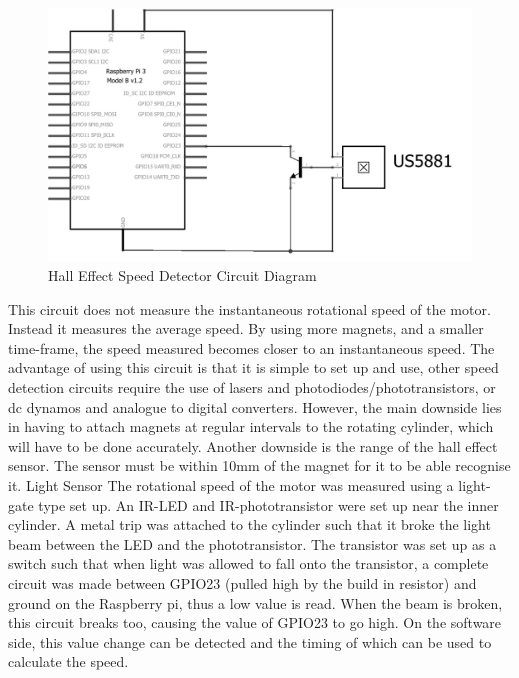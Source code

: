 \documentclass[twoside,a4]{report}
\def\br{\newline \newline \noindent}
\begin{document}
\begin{figure}[!htb]
	\centering
	\includegraphics[scale=0.3]{images/circspeeddet.png}
	\caption{Hall Effect Speed Detector Circuit Diagram}
	\label{circhall}
\end{figure} \newline  \noindent
This circuit does not measure the instantaneous rotational speed of the motor. Instead it measures the average speed. By using more magnets, and a smaller time-frame, the speed measured becomes closer to an instantaneous speed. The advantage of using this circuit is that it is simple to set up and use, other speed detection circuits require the use of lasers and photodiodes/phototransistors, or dc dynamos and analogue to digital converters. However, the main downside lies in having to attach magnets at regular intervals to the rotating cylinder, which will have to be done accurately. Another downside is the range of the hall effect sensor. The sensor must be within 10mm of the magnet for it to be able recognise it. \newline \newline \noindent
\large Light Sensor \normalsize \br
The rotational speed of the motor was measured using a light-gate type set up. An IR-LED and IR-phototransistor were set up near the inner cylinder. A metal trip was attached to the cylinder such that it broke the light beam between the LED and the phototransistor. The transistor was set up as a switch such that when light was allowed to fall onto the transistor, a complete circuit was made between GPIO23 (pulled high by the build in resistor) and ground on the Raspberry pi, thus a low value is read. When the beam is broken, this circuit breaks too, causing the value of GPIO23 to go high. On the software side, this value change can be detected and the timing of which can be used to calculate the speed. \newline
\end{document}
